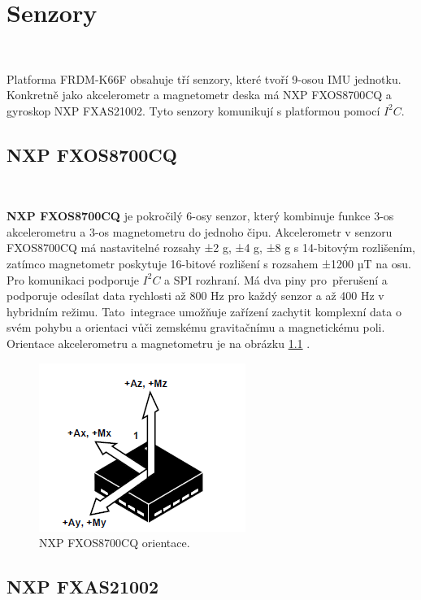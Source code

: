 \chapter{Senzory}
\label{sec:Sensors}
\vspace{-20pt}
\

Platforma FRDM-K66F obsahuje tří senzory, které tvoří
9-osou IMU jednotku. Konkretně jako akcelerometr a magnetometr deska má
NXP FXOS8700CQ a gyroskop NXP FXAS21002. Tyto senzory komunikují s platformou
pomocí $I^2C$\cite{frdmk66UserGuide}.

\section{NXP FXOS8700CQ}\

\textbf{NXP FXOS8700CQ} je pokročilý 6-osy senzor,
který kombinuje funkce 3-os akcelerometru
a 3-os magnetometru do jednoho čipu. Akcelerometr v senzoru FXOS8700CQ má
nastavitelné rozsahy ±2 g, ±4 g, ±8 g s 14-bitovým rozlišením, zatímco magnetometr
poskytuje 16-bitové rozlišení s rozsahem ±1200 µT na osu. Pro komunikaci podporuje
$I^2C$ a SPI rozhraní. Má dva piny pro~přerušení a podporuje odesílat data rychlosti
až 800 Hz pro každý senzor a až 400 Hz v hybridním režimu.
Tato~integrace umožňuje zařízení zachytit komplexní data o svém pohybu a
orientaci vůči zemskému gravitačnímu a magnetickému poli.
Orientace akcelerometru a magnetometru je na obrázku \ref{fig:FXOS_Orientation}
\cite{FXOS8700CQ}.

\begin{figure}[!h]
    \centering
    \includegraphics[width = 0.5\linewidth]{Figures/FXOS_Orientation.png}
    \caption{NXP FXOS8700CQ orientace\cite{FXOS8700CQ}.}
    \label{fig:FXOS_Orientation}
\end{figure}

\section{NXP FXAS21002}\

